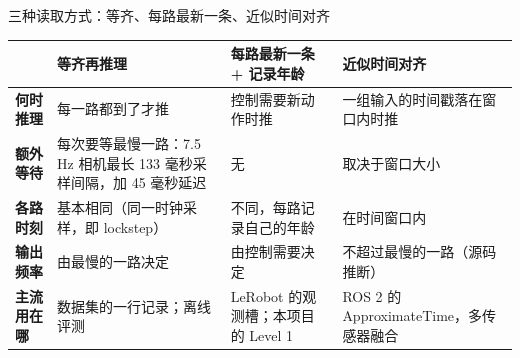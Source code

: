 \begin{frame}[t]{三种读取方式：等齐、每路最新一条、近似时间对齐}
\renewcommand{\arraystretch}{1.22}
\scriptsize
\begin{tabularx}{\textwidth}{>{\bfseries}p{2.1cm} Y Y Y}
\toprule
{}
 & 等齐再推理 & 每路最新一条 + 记录年龄 & 近似时间对齐 \\
\midrule
何时推理 & 每一路都到了才推 & 控制需要新动作时推 & 一组输入的时间戳落在窗口内时推 \\
额外等待 & 每次要等最慢一路：7.5 Hz 相机最长 133 毫秒采样间隔，加 45 毫秒延迟 & 无 & 取决于窗口大小 \\
各路时刻 & 基本相同（同一时钟采样，即 lockstep） & 不同，每路记录自己的年龄 & 在时间窗口内 \\
输出频率 & 由最慢的一路决定 & 由控制需要决定 & 不超过最慢的一路（源码推断） \\
主流用在哪 & 数据集的一行记录；离线评测 & LeRobot 的观测槽；本项目的 Level 1 & ROS 2  的 ApproximateTime，多传感器融合 \\
\bottomrule
\end{tabularx}
\par{}
\par{}
\end{frame}
